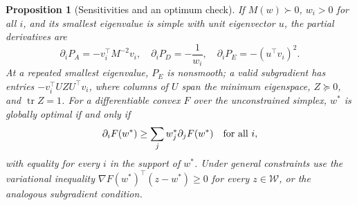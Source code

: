 \documentclass[11pt]{article}
\newcommand{\tr}{\operatorname{tr}}
\newtheorem{proposition}{Proposition}
\begin{document}
\vspace{0.3cm}

\begin{proposition}[Sensitivities and an optimum check]\label{prop:gradient}
If $M(w)\succ0$, $w_i>0$ for all $i$, and its smallest eigenvalue is simple with unit eigenvector $u$, the partial derivatives are
\begin{equation}\label{eq:gradients}
\partial_iP_A=-v_i^\top M^{-2}v_i,\quad
\partial_iP_D=-\frac{1}{w_i},\quad
\partial_iP_E=-(u^\top v_i)^2.
\end{equation}
At a repeated smallest eigenvalue, $P_E$ is nonsmooth; a valid subgradient has entries $-v_i^\top UZU^\top v_i$, where columns of $U$ span the minimum eigenspace, $Z\succeq0$, and $\tr Z=1$. For a differentiable convex $F$ over the unconstrained simplex, $w^*$ is globally optimal if and only if
\begin{equation}\label{eq:equivalence}
 \partial_iF(w^*)\geq \sum_jw_j^*\partial_jF(w^*)\quad\hbox{for all }i,
\end{equation}
with equality for every $i$ in the support of $w^*$. Under general constraints use the variational inequality $\nabla F(w^*)^\top(z-w^*)\geq0$ for every $z\in\mathcal W$, or the analogous subgradient condition.
\end{proposition}
\end{document}
